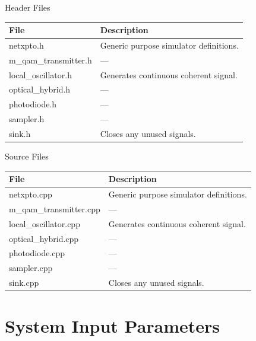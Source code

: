\documentclass[a4paper]{article}
\begin{document}
Header Files
\begin{table}[H]
\centering
\begin{tabulary}{1.0\textwidth}{|L|L|}
\hline
\textbf{File}           & \textbf{Description}                           \\
\hline
netxpto.h               & Generic purpose simulator definitions.         \\
\hline
m\_qam\_transmitter.h   & ---\\
\hline
local\_oscillator.h     & Generates continuous coherent signal.            \\
\hline
optical\_hybrid.h       & ---\\
\hline
photodiode.h            & ---\\
\hline
sampler.h               & ---\\
\hline
sink.h                  & Closes any unused signals.                       \\
\hline
\end{tabulary}
\end{table}
%
%
Source Files
\begin{table}[H]
\centering
\begin{tabulary}{1.0\textwidth}{|L|L|}
\hline
\textbf{File}                   & \textbf{Description}\\
\hline
netxpto.cpp                     & Generic purpose simulator definitions.\\
\hline
m\_qam\_transmitter.cpp         & ---\\
\hline
local\_oscillator.cpp           & Generates continuous coherent signal.\\
\hline
optical\_hybrid.cpp             & ---\\
\hline
photodiode.cpp                  & ---\\
\hline
sampler.cpp                     & ---\\
\hline
sink.cpp                        & Closes any unused signals.\\
\hline
\end{tabulary}
\end{table}


\section{System Input Parameters}
\end{document}

